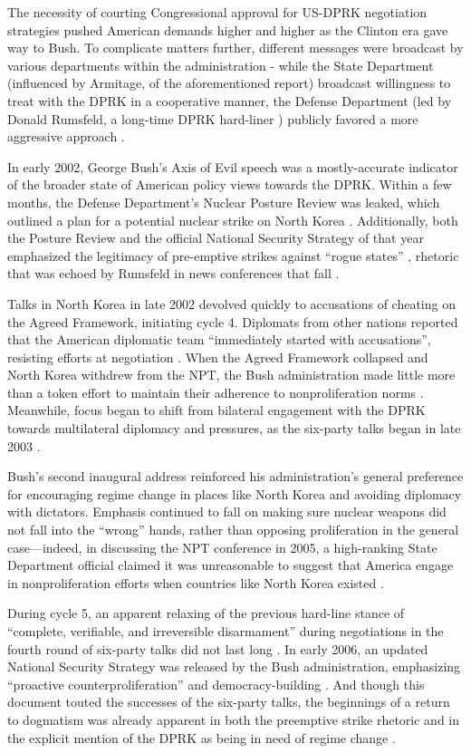 The necessity of courting Congressional approval for US-DPRK negotiation strategies pushed American demands higher and higher as the Clinton era gave way to Bush. To complicate matters further, different messages were broadcast by various departments within the administration - while the State Department (influenced by Armitage, of the aforementioned report) broadcast willingness to treat with the DPRK in a cooperative manner, the Defense Department (led by Donald Rumsfeld, a long-time DPRK hard-liner \cite{rumsfeld}) publicly favored a more aggressive approach \cite{harnisch}.

In early 2002, George Bush's Axis of Evil speech was a mostly-accurate indicator of the broader state of American policy views towards the DPRK. Within a few months, the Defense Department's Nuclear Posture Review was leaked, which outlined a plan for a potential nuclear strike on North Korea \cite{npreview}. Additionally, both the Posture Review and the official National Security Strategy of that year emphasized the legitimacy of pre-emptive strikes against ``rogue states'' \cite{bleiker}, rhetoric that was echoed by Rumsfeld in news conferences that fall \cite{harnisch}.

Talks in North Korea in late 2002 devolved quickly to accusations of cheating on the Agreed Framework, initiating cycle 4. Diplomats from other nations reported that the American diplomatic team ``immediately started with accusations'', resisting efforts at negotiation \cite{bleiker}. When the Agreed Framework collapsed and North Korea withdrew from the NPT, the Bush administration made little more than a token effort to maintain their adherence to nonproliferation norms \cite{huntley}. Meanwhile, focus began to shift from bilateral engagement with the DPRK towards multilateral diplomacy and pressures, as the six-party talks began in late 2003 \cite{crs13}.

Bush's second inaugural address reinforced his administration's general preference for encouraging regime change in places like North Korea and avoiding diplomacy with dictators. Emphasis continued to fall on making sure nuclear weapons did not fall into the ``wrong'' hands, rather than opposing proliferation in the general case---indeed, in discussing the NPT conference in 2005, a high-ranking State Department official claimed it was unreasonable to suggest that America engage in nonproliferation efforts when countries like North Korea existed \cite{huntley}.

During cycle 5, an apparent relaxing of the previous hard-line stance of ``complete, verifiable, and irreversible disarmament'' during negotiations in the fourth round of six-party talks did not last long \cite{huntley}. In early 2006, an updated National Security Strategy was released by the Bush administration, emphasizing ``proactive counterproliferation'' and democracy-building \cite{nss06}. And though this document touted the successes of the six-party talks, the beginnings of a return to dogmatism was already apparent in both the preemptive strike rhetoric and in the explicit mention of the DPRK as being in need of regime change \cite{nss06}.

